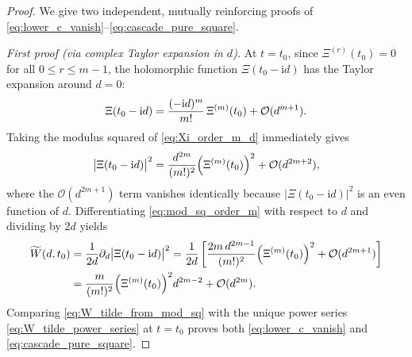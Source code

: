 \documentclass[11pt,reqno,a4paper]{amsart}
\theoremstyle{plain}
\theoremstyle{definition}
\theoremstyle{remark}
\numberwithin{equation}{section}
\newcommand{\fac}{\mathclose{\mathchar"0021}}
\newcommand{\ii}{\mathrm{i}}
\begin{document}
\begin{proof}
We give two independent, mutually reinforcing proofs of \eqref{eq:lower_c_vanish}--\eqref{eq:cascade_pure_square}.

\medskip\noindent
\emph{First proof (via complex Taylor expansion in $d$).}
At $t = t_0$, since $\Xi^{(r)}(t_0) = 0$ for all $0 \le r \le m-1$, the holomorphic function $\Xi(t_0 - \ii d)$ has the Taylor expansion around $d = 0$:
\begin{equation}\label{eq:Xi_order_m_d}
  \Xi(t_0 - \ii d) = \frac{(-\ii d)^m}{m\fac}\,\Xi^{(m)}(t_0) + \mathcal{O}(d^{m+1}).
\end{equation}
Taking the modulus squared of \eqref{eq:Xi_order_m_d} immediately gives
\begin{equation}\label{eq:mod_sq_order_m}
  \big|\Xi(t_0 - \ii d)\big|^2 = \frac{d^{2m}}{(m\fac)^2}\Big(\Xi^{(m)}(t_0)\Big)^2 + \mathcal{O}(d^{2m+2}),
\end{equation}
where the $\mathcal{O}(d^{2m+1})$ term vanishes identically because $|\Xi(t_0 - \ii d)|^2$ is an even function of $d$. Differentiating \eqref{eq:mod_sq_order_m} with respect to $d$ and dividing by $2d$ yields
\begin{equation}\label{eq:W_tilde_from_mod_sq}
\begin{aligned}
  \widetilde{W}(d, t_0) &= \frac{1}{2d}\partial_d\big|\Xi(t_0 - \ii d)\big|^2
  = \frac{1}{2d}\left[\frac{2m\,d^{2m-1}}{(m\fac)^2}\Big(\Xi^{(m)}(t_0)\Big)^2 + \mathcal{O}(d^{2m+1})\right] \\
  &= \frac{m}{(m\fac)^2}\Big(\Xi^{(m)}(t_0)\Big)^2 d^{2m-2} + \mathcal{O}(d^{2m}).
\end{aligned}
\end{equation}
Comparing \eqref{eq:W_tilde_from_mod_sq} with the unique power series \eqref{eq:W_tilde_power_series} at $t = t_0$ proves both \eqref{eq:lower_c_vanish} and \eqref{eq:cascade_pure_square}.


\end{proof}
\end{document}
